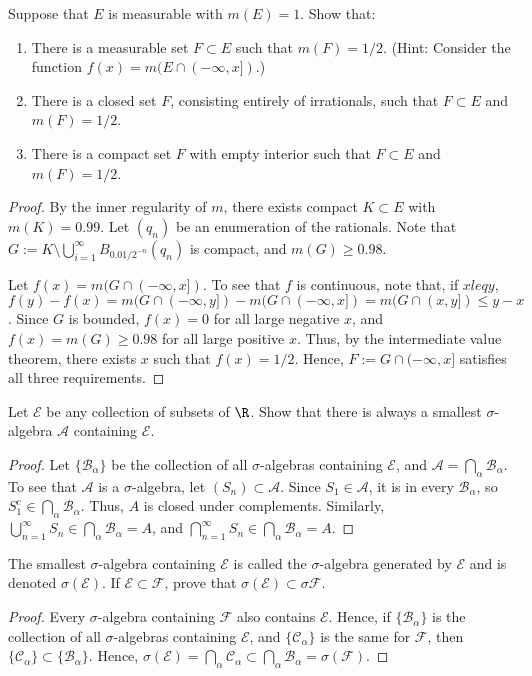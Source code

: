  Suppose that $E$ is measurable with $m(E) = 1$. Show that:
\begin{enumerate}
\item There is a measurable set $F \subset E$ such that $m(F) = 1/2$. (Hint: Consider the function $f(x) = m(E \cap (-\infty, x])$.)
\item There is a closed set $F$, consisting entirely of irrationals, such that $F \subset E$ and $m(F) = 1/2$.
\item There is a compact set $F$ with empty interior such that $F \subset E$ and $m(F) = 1/2$.
\end{enumerate}
\begin{proof}
By the inner regularity of $m$, there exists compact $K \subset E$ with $m(K) = 0.99$. Let $(q_n)$ be an enumeration of the rationals. Note that $G := K \setminus \bigcup_{i=1}^\infty B_{0.01/2^{-n}}(q_n)$ is compact, and $m(G) \geq 0.98$. 

Let $f(x) = m(G \cap (-\infty,x])$. To see that $f$ is continuous, note that, if $x leq y$, $f(y) - f(x) = m(G \cap (-\infty,y]) - m(G \cap (-\infty,x]) = m(G \cap (x,y]) \leq y-x$. Since $G$ is bounded, $f(x) = 0$ for all large negative $x$, and $f(x) = m(G) \geq 0.98$ for all large positive $x$. Thus, by the intermediate value theorem, there exists $x$ such that $f(x) = 1/2$.  Hence, $F:= G \cap (-\infty, x]$ satisfies all three requirements.

\end{proof}



 Let $\mathcal{E}$ be any collection of subsets of $\R$. Show that there is always a smallest $\sigma$-algebra $\mathcal{A}$ containing $\mathcal{E}$.
\begin{proof}
Let $\{\mathcal B_\alpha\}$ be the collection of all $\sigma$-algebras containing $\mathcal{E}$, and $\mathcal A = \bigcap_\alpha \mathcal B_\alpha$. To see that $\mathcal A$ is a $\sigma$-algebra, let $(S_n) \subset \mathcal A$. Since $S_1 \in \mathcal A$, it is in every $\mathcal B_\alpha$, so $S_1^c \in \bigcap_\alpha \mathcal B_\alpha$.  Thus, $A$ is closed under complements. Similarly, $\bigcup_{n=1}^\infty S_n \in \bigcap_\alpha \mathcal B_\alpha = A$, and $\bigcap_{n=1}^\infty S_n \in \bigcap_\alpha \mathcal B_\alpha = A$.
\end{proof}

 The smallest $\sigma$-algebra containing $\mathcal{E}$ is called the $\sigma$-algebra generated by $\mathcal{E}$ and is denoted $\sigma(\mathcal{E})$. If $\mathcal{E} \subset \mathcal{F}$, prove that $\sigma(\mathcal{E}) \subset \sigma{\mathcal{F}}$.
\begin{proof}
Every $\sigma$-algebra containing $\mathcal F$ also contains $\mathcal E$. Hence, if $\{\mathcal B_\alpha\}$ is the collection of all $\sigma$-algebras containing $\mathcal{E}$, and $\{\mathcal C_\alpha\}$ is the same for $\mathcal F$, then $\{\mathcal C_\alpha\} \subset \{\mathcal B_\alpha\}$.  Hence, $\sigma(\mathcal E) = \bigcap_\alpha \mathcal C_\alpha \subset \bigcap_\alpha \mathcal B_\alpha = \sigma(\mathcal F)$.
\end{proof}


